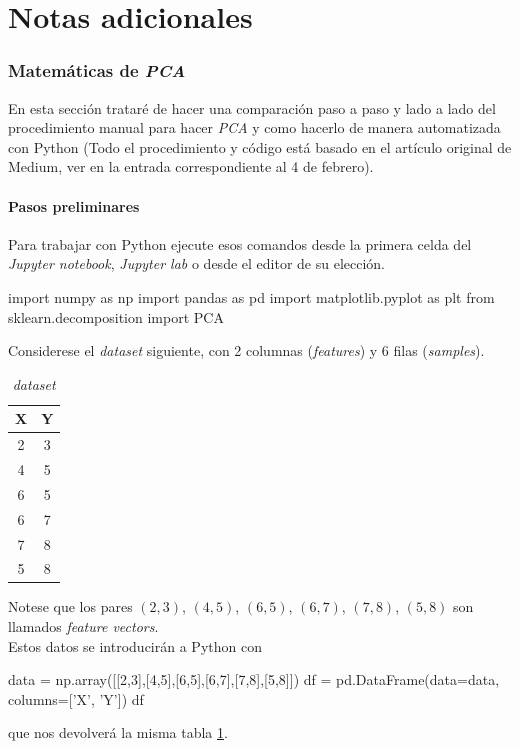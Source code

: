 \newpage

\part{Notas adicionales} \label{Notas}
\section{Matemáticas de \textit{PCA}}\label{PCAmath}
En esta sección trataré de hacer una comparación paso a paso y lado a lado del procedimiento manual para hacer \textit{PCA} y como hacerlo de manera automatizada con Python (Todo el procedimiento y código está basado en el artículo original de Medium, ver en la entrada correspondiente al 4 de febrero).
\subsection{Pasos preliminares}
Para trabajar con Python ejecute esos comandos desde la primera celda del \textit{Jupyter notebook}, \textit{Jupyter lab} o desde el editor de su elección.
\begin{jupyter}{1}
import numpy as np
import pandas as pd
import matplotlib.pyplot as plt
from sklearn.decomposition import PCA
\end{jupyter}
Considerese el \textit{dataset} siguiente, con 2 columnas (\textit{features}) y 6 filas (\textit{samples}).
\begin{table}[H]
\centering
\begin{tabular}{cc}
\sffamily X & \sffamily Y \\ 
\hline
\rowcolor[HTML]{EFEFEF} 
2 & 3 \\
4 & 5 \\
\rowcolor[HTML]{EFEFEF} 
6 & 5 \\
6 & 7 \\
\rowcolor[HTML]{EFEFEF} 
7 & 8 \\
5 & 8
\end{tabular}
\caption{\textit{dataset}}\label{tab:PCAmath-dataset}
\end{table}
Notese que los pares $(2,3)$, $(4,5)$, $(6,5)$, $(6,7)$, $(7,8)$, $(5,8)$ son llamados \textit{feature vectors}.\\

Estos datos se introducirán a Python con
\begin{jupyter}{2}
data = np.array([[2,3],[4,5],[6,5],[6,7],[7,8],[5,8]])
df = pd.DataFrame(data=data, columns=['X', 'Y'])
df
\end{jupyter}
que nos devolverá la misma tabla \ref{tab:PCAmath-dataset}.


